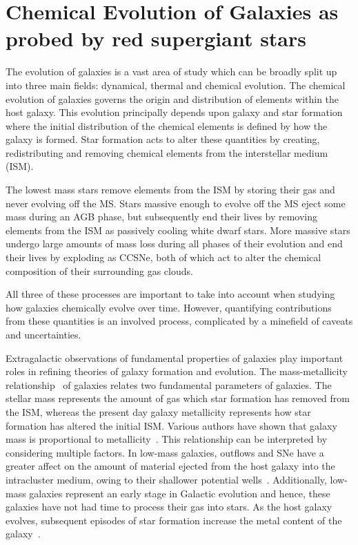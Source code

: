 
\section{Chemical Evolution of Galaxies as probed by red supergiant stars} %
\label{sec:chemical evolution}


The evolution of galaxies is a vast area of study which can be broadly split up into three main fields: dynamical, thermal and chemical evolution.
The chemical evolution of galaxies governs the origin and distribution of elements within the host galaxy.
This evolution principally depends upon galaxy and star formation where
the initial distribution of the chemical elements is defined by how the galaxy is formed.
Star formation acts to alter these quantities by creating, redistributing and removing chemical elements from the interstellar medium (ISM).

The lowest mass stars remove elements from the ISM by storing their gas and never evolving off the MS.
Stars massive enough to evolve off the MS eject some mass during an AGB phase, but subsequently end their lives by removing elements from the ISM as passively cooling white dwarf stars.
More massive stars undergo large amounts of mass loss during all phases of their evolution and end their lives by exploding as CCSNe, both of which act to alter the chemical composition of their surrounding gas clouds.

All three of these processes are important to take into account when studying how galaxies chemically evolve over time.
However, quantifying contributions from these quantities is an involved process, complicated by a minefield of caveats and uncertainties.

Extragalactic observations of fundamental properties of galaxies play important roles in refining theories of galaxy formation and evolution.
The mass-metallicity relationship~\citep[MZR;][]{Lequeux79} of galaxies relates two fundamental parameters of galaxies.
The stellar mass represents the amount of gas which star formation has removed from the ISM, whereas the present day galaxy metallicity represents how star formation has altered the initial ISM.
Various authors have shown that galaxy mass is proportional to metallicity~\citep{Tremonti04, Maiolino08,Kewley08}.
This relationship can be interpreted by considering multiple factors.
In low-mass galaxies, outflows and SNe have a greater affect on the amount of material ejected from the host galaxy into the intracluster medium, owing to their shallower potential wells~\citep[e.g.][]{Tremonti04}.
Additionally, low-mass galaxies represent an early stage in Galactic evolution and hence, these galaxies have not had time to process their gas into stars.
As the host galaxy evolves, subsequent episodes of star formation increase the metal content of the galaxy~\citep[e.g.][and references therein]{Maiolino08}.

